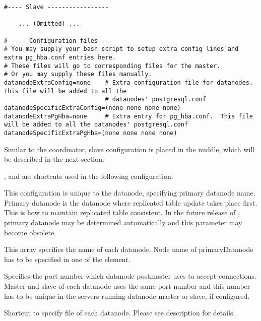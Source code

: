 \begin{lstlisting}[frame=single, basicstyle=\ttfamily\tiny]
#---- Slave -----------------

	... (Omitted) ...

# ---- Configuration files ---
# You may supply your bash script to setup extra config lines and extra pg_hba.conf entries here.
# These files will go to corresponding files for the master.
# Or you may supply these files manually.
datanodeExtraConfig=none    # Extra configuration file for datanodes.  This file will be added to all the 
                            # datanodes' postgresql.conf
datanodeSpecificExtraConfig=(none none none none)
datanodeExtraPgHba=none     # Extra entry for pg_hba.conf.  This file will be added to all the datanodes' postgresql.conf
datanodeSpecificExtraPgHba=(none none none none)
  \end{lstlisting}
  
  Similar to the coordinator, slave configuration is placed in the middle, which will be described in the next section.
  
  ,  and  are shortcuts used
  in the following configuration.
  
  
	  This configuration is unique to the datanode, specifying primary datanode name.
	  Primary datanode is the datanode where replicated table update takes place first.
	  This is how to maintain replicated table consistent.
	  In the future release of \XC, primary datanode may be determined automatically and this
	  parameter may become obsolete.
  
  
	  This array specifies the name of each datanode.
	  Node name of primaryDatanode has to be specified in one of the element.
  
  
	  Specifies the port number which datanode postmaster uses to accept connections.
	  Master and slave of each datanode uses the same port number and this number has to be
	  unique in the servers running datanode master or slave, if configured.
  
  
	  Shortcut to specify  file of each datanode.
	  Please see  description for details.
  
  
